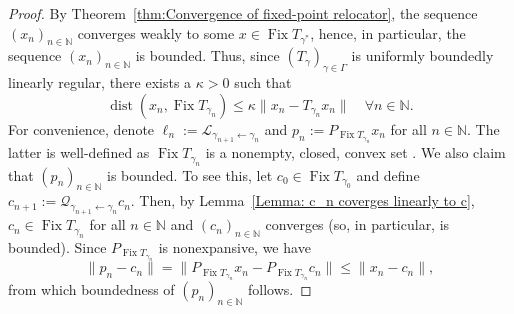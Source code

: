 \documentclass[a4paper,12pt]{article}
\DeclareMathOperator{\Fix}{Fix}
\DeclareMathOperator{\dist}{dist}
\begin{document}
\begin{proof}
By Theorem~\ref{thm:Convergence of fixed-point relocator}, the sequence $(x_n)_{n\in\mathbb{N}}$ converges weakly to some $x\in\Fix T_{\gamma^*}$, hence, in particular, the sequence $(x_n)_{n\in\mathbb{N}}$ is bounded. Thus, since $(T_\gamma)_{\gamma\in\Gamma}$ is uniformly boundedly linearly regular, there exists a $\kappa>0$ such that 
\begin{equation}\label{eq:error bound in proof}
    \dist(x_n, \Fix T_{\gamma_n})\leq \kappa \|x_n - T_{\gamma_n} x_n\|\quad\forall n\in\mathbb{N}.
\end{equation}
For convenience, denote $\ell_n:=\mathcal{L}_{\gamma_{n+1}\leftarrow\gamma_n}$ and $p_n:=P_{\Fix T_{\gamma_n}}x_n$ for all $n \in \mathbb{N}$. The latter is well-defined as $\Fix T_{\gamma_n}$ is a nonempty, closed, convex set \cite[Corollary~4.24 \& Theorem~4.29]{bauschke2017convex}.
We also claim that $(p_n)_{n \in \mathbb{N}}$ is bounded. To see this, let $c_0\in\Fix T_{\gamma_0}$ and define $c_{n+1}:=\mathcal{Q}_{\gamma_{n+1}\leftarrow\gamma_n}c_n$. Then, by Lemma~\ref{Lemma: c_n coverges linearly to c}, $c_n\in\Fix T_{\gamma_n}$ for all $n\in\mathbb{N}$ and $(c_n)_{n \in \mathbb{N}}$ converges (so, in particular, is bounded). Since $P_{\Fix T_{\gamma_n}}$ is nonexpansive, we have
$$ \|p_n-c_n\| = \|P_{\Fix T_{\gamma_n}}x_n-P_{\Fix T_{\gamma_n}}c_n\|\leq \|x_n-c_n\|,$$
from which boundedness of $(p_n)_{n \in \mathbb{N}}$ follows. 


\end{proof}
\end{document}
